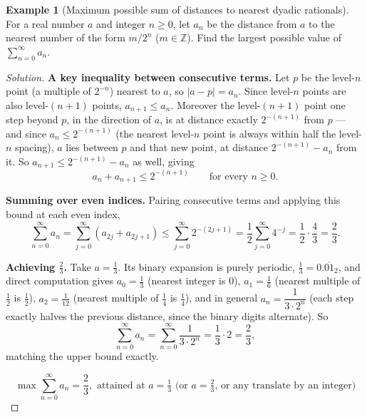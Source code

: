 \documentclass[11pt]{article}
\theoremstyle{definition}
\newtheorem{example}{Example}[section]
\newcommand{\Z}{\mathbb{Z}}
\begin{document}
\begin{example}[Maximum possible sum of distances to nearest dyadic rationals]
For a real number $a$ and integer $n\ge0$, let $a_n$ be the distance from $a$ to the nearest number of the form $m/2^n$ ($m\in\Z$). Find the largest possible value of $\sum_{n=0}^\infty a_n$.
\end{example}
\begin{proof}[Solution]
\textbf{A key inequality between consecutive terms.} Let $p$ be the level-$n$ point (a multiple of $2^{-n}$) nearest to $a$, so $|a-p|=a_n$. Since level-$n$ points are also level-$(n+1)$ points, $a_{n+1}\le a_n$. Moreover the level-$(n+1)$ point one step beyond $p$, in the direction of $a$, is at distance exactly $2^{-(n+1)}$ from $p$ — and since $a_n\le2^{-(n+1)}$ (the nearest level-$n$ point is always within half the level-$n$ spacing), $a$ lies between $p$ and that new point, at distance $2^{-(n+1)}-a_n$ from it. So $a_{n+1}\le2^{-(n+1)}-a_n$ as well, giving
\[
a_n+a_{n+1}\le2^{-(n+1)}\qquad\text{for every }n\ge0.
\]

\textbf{Summing over even indices.} Pairing consecutive terms and applying this bound at each even index,
\[
\sum_{n=0}^\infty a_n=\sum_{j=0}^\infty(a_{2j}+a_{2j+1})\le\sum_{j=0}^\infty2^{-(2j+1)}=\frac12\sum_{j=0}^\infty4^{-j}=\frac12\cdot\frac{4}{3}=\frac23.
\]

\textbf{Achieving $\frac23$.} Take $a=\frac13$. Its binary expansion is purely periodic, $\frac13=0.\overline{01}_2$, and direct computation gives $a_0=\frac13$ (nearest integer is $0$), $a_1=\frac16$ (nearest multiple of $\frac12$ is $\frac12$), $a_2=\frac1{12}$ (nearest multiple of $\frac14$ is $\frac14$), and in general $a_n=\dfrac1{3\cdot2^n}$ (each step exactly halves the previous distance, since the binary digits alternate). So
\[
\sum_{n=0}^\infty a_n=\sum_{n=0}^\infty\frac1{3\cdot2^n}=\frac13\cdot2=\frac23,
\]
matching the upper bound exactly.

\[
\boxed{\max\sum_{n=0}^\infty a_n=\frac23,\text{ attained at }a=\tfrac13\text{ (or }a=\tfrac23\text{, or any translate by an integer)}}
\]
\end{proof}
\end{document}
